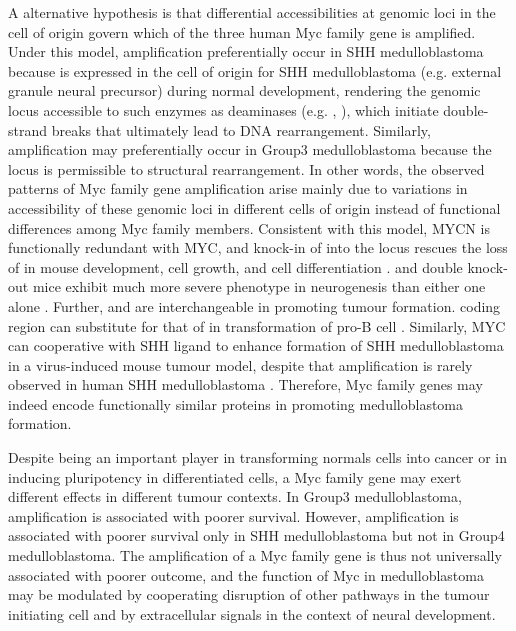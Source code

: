 A alternative hypothesis is that differential accessibilities at genomic loci in the cell of origin govern which of the three human Myc family gene is amplified. Under this model,  amplification preferentially occur in SHH medulloblastoma because  is expressed in the cell of origin for SHH medulloblastoma (e.g. external granule neural precursor) during normal development, rendering the genomic locus accessible to such enzymes as deaminases (e.g. , ), which initiate double-strand breaks that ultimately lead to DNA rearrangement. Similarly,  amplification may preferentially occur in Group3 medulloblastoma because the  locus is permissible to structural rearrangement. In other words, the observed patterns of Myc family gene amplification arise mainly due to variations in accessibility of these genomic loci in different cells of origin instead of functional differences among Myc family members. Consistent with this model, MYCN is functionally redundant with MYC, and knock-in of  into the  locus rescues the loss of  in mouse development, cell growth, and cell differentiation .  and  double knock-out mice exhibit much more severe phenotype in neurogenesis than either one alone . Further,  and  are interchangeable in promoting tumour formation.  coding region can substitute for that of  in transformation of pro-B cell . Similarly, MYC can cooperative with SHH ligand to enhance formation of SHH medulloblastoma in a virus-induced mouse tumour model, despite that  amplification is rarely observed in human SHH medulloblastoma . Therefore, Myc family genes may indeed encode functionally similar proteins in promoting medulloblastoma formation.

Despite being an important player in transforming normals cells into cancer or in inducing pluripotency in differentiated cells, a Myc family
gene may exert different effects in different tumour contexts. In Group3 medulloblastoma,  amplification is associated with poorer survival. However,  amplification is associated with poorer survival only in SHH medulloblastoma but not in Group4 medulloblastoma. The amplification of a Myc family gene is thus not universally associated with poorer outcome, and the function of Myc in medulloblastoma may be modulated by cooperating disruption of other pathways in the tumour initiating cell and by extracellular signals in the context of neural development.

